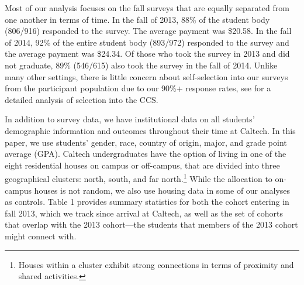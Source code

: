 \documentclass[12pt,letterpaper,english]{article}
\begin{document}
Most of our analysis focuses on the fall surveys that are equally separated from one another in terms of time. In the fall of 2013, 88\% of the student body (806/916) responded to the survey.%
The average payment was \$20.58. In the fall of 2014, 92\% of the entire student body (893/972) responded to the survey and the average payment was \$24.34. %
Of those who took the survey in 2013 and did not graduate, 89\% (546/615) also took the survey in the fall of 2014. Unlike many other settings, there is little concern about self-selection into our surveys from the participant population due to our 90\%+ response rates, see \cite{snowberg2021testing} for a detailed analysis of selection into the CCS.  %





In addition to survey data, we have institutional data on all students' demographic information and outcomes throughout their time at Caltech. In this paper, we use students' gender, race, country of origin, major, and grade point average (GPA). Caltech undergraduates have the option of living in one of the eight residential houses on campus or off-campus, that are divided into three geographical clusters: north, south, and far north.\footnote{Houses within a cluster exhibit strong connections in terms of proximity and shared activities.} While the allocation to on-campus houses is not random, we also use housing data in some of our analyses as controls. Table 1 provides summary statistics for both the cohort entering in fall 2013, which we track since arrival at Caltech, as well as the set of cohorts that overlap with the 2013 cohort---the students that members of the 2013 cohort might connect with.
\end{document}
